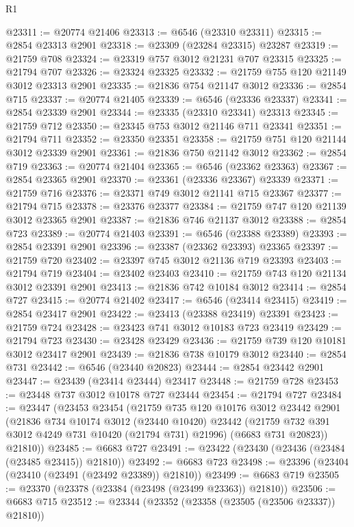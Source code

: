 \begin{lexlean}{R1}
\begin{coremodule}
@23311 := @20774 @21406
@23313 := @6546 (@23310 @23311)
@23315 := @2854 @23313 @2901
@23318 := @23309 (@23284 @23315) @23287
@23319 := @21759 @708
@23324 := @23319 @757 @3012 @21231 @707 @23315
@23325 := @21794 @707
@23326 := @23324 @23325
@23332 := @21759 @755 @120 @21149 @3012 @23313 @2901
@23335 := @21836 @754 @21147 @3012
@23336 := @2854 @715
@23337 := @20774 @21405
@23339 := @6546 (@23336 @23337)
@23341 := @2854 @23339 @2901
@23344 := @23335 (@23310 @23341) @23313
@23345 := @21759 @712
@23350 := @23345 @753 @3012 @21146 @711 @23341
@23351 := @21794 @711
@23352 := @23350 @23351
@23358 := @21759 @751 @120 @21144 @3012 @23339 @2901
@23361 := @21836 @750 @21142 @3012
@23362 := @2854 @719
@23363 := @20774 @21404
@23365 := @6546 (@23362 @23363)
@23367 := @2854 @23365 @2901
@23370 := @23361 (@23336 @23367) @23339
@23371 := @21759 @716
@23376 := @23371 @749 @3012 @21141 @715 @23367
@23377 := @21794 @715
@23378 := @23376 @23377
@23384 := @21759 @747 @120 @21139 @3012 @23365 @2901
@23387 := @21836 @746 @21137 @3012
@23388 := @2854 @723
@23389 := @20774 @21403
@23391 := @6546 (@23388 @23389)
@23393 := @2854 @23391 @2901
@23396 := @23387 (@23362 @23393) @23365
@23397 := @21759 @720
@23402 := @23397 @745 @3012 @21136 @719 @23393
@23403 := @21794 @719
@23404 := @23402 @23403
@23410 := @21759 @743 @120 @21134 @3012 @23391 @2901
@23413 := @21836 @742 @10184 @3012
@23414 := @2854 @727
@23415 := @20774 @21402
@23417 := @6546 (@23414 @23415)
@23419 := @2854 @23417 @2901
@23422 := @23413 (@23388 @23419) @23391
@23423 := @21759 @724
@23428 := @23423 @741 @3012 @10183 @723 @23419
@23429 := @21794 @723
@23430 := @23428 @23429
@23436 := @21759 @739 @120 @10181 @3012 @23417 @2901
@23439 := @21836 @738 @10179 @3012
@23440 := @2854 @731
@23442 := @6546 (@23440 @20823)
@23444 := @2854 @23442 @2901
@23447 := @23439 (@23414 @23444) @23417
@23448 := @21759 @728
@23453 := @23448 @737 @3012 @10178 @727 @23444
@23454 := @21794 @727
@23484 := @23447
    (@23453
      @23454
      (@21759
        @735
        @120
        @10176
        @3012
        @23442
        @2901
        (@21836
          @734
          @10174
          @3012
          (@23440 @10420)
          @23442
          (@21759 @732 @391 @3012 @4249 @731 @10420 (@21794 @731) @21996)
          (@6683 @731 @20823))
        @21810))
@23485 := @6683 @727
@23491 := @23422 (@23430 (@23436 (@23484 (@23485 @23415)) @21810))
@23492 := @6683 @723
@23498 := @23396 (@23404 (@23410 (@23491 (@23492 @23389)) @21810))
@23499 := @6683 @719
@23505 := @23370 (@23378 (@23384 (@23498 (@23499 @23363)) @21810))
@23506 := @6683 @715
@23512 := @23344 (@23352 (@23358 (@23505 (@23506 @23337)) @21810))

\end{coremodule}
\end{lexlean}
